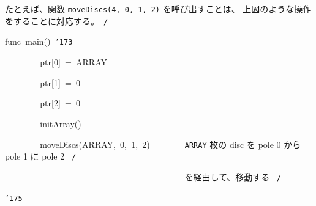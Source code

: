 \documentclass{article}
\begin{document}
たとえば、関数 {\tt moveDiscs(4, 0, 1, 2)} を呼び出すことは、
上図のような操作をすることに対応する。\hfill \rm\mc \ {\tt *}{\tt /}
\tt\mc 

\noindent
\mbox{}\hfill

\noindent
\mbox{}\hfill

\noindent
\mbox{}func{\tt\mc \ }main(){\tt\mc \ }{\tt\char'173}

\noindent
\mbox{}{\tt\mc \ \ \ \ \ \ \ \ }ptr[0]{\tt\mc \ }={\tt\mc \ }ARRAY

\noindent
\mbox{}{\tt\mc \ \ \ \ \ \ \ \ }ptr[1]{\tt\mc \ }={\tt\mc \ }0

\noindent
\mbox{}{\tt\mc \ \ \ \ \ \ \ \ }ptr[2]{\tt\mc \ }={\tt\mc \ }0

\noindent
\mbox{}\hfill

\noindent
\mbox{}{\tt\mc \ \ \ \ \ \ \ \ }initArray()

\noindent
\mbox{}{\tt\mc \ \ \ \ \ \ \ \ }moveDiscs(ARRAY,{\tt\mc \ }0,{\tt\mc \ }1,{\tt\mc \ }2){\tt\mc \ \ \ \ \ \ \ }\rm\mc {\tt /}{\tt *}\  {}{\tt ARRAY} 枚の disc を
					   pole 0 から pole 1 に pole 2
					   \hfill \rm\mc \ {\tt *}{\tt /}
\tt\mc 

\noindent
\mbox{}{\tt\mc \ \ \ \ \ \ \ \ }{\tt\mc \ \ \ \ \ \ \ \ }{\tt\mc \ \ \ \ \ \ \ \ }{\tt\mc \ \ \ \ \ \ \ \ }{\tt\mc \ \ \ \ \ \ \ \ }\rm\mc {\tt /}{\tt *}\  {}を経由して、移動する \hfill \rm\mc \ {\tt *}{\tt /}
\tt\mc 

\noindent
\mbox{}{\tt\char'175}

\noindent
\mbox{}

\rm\mc
\end{document}
